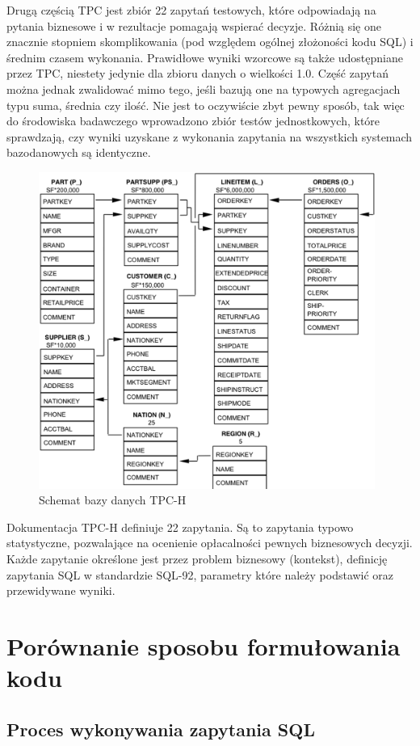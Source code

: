 \documentclass[12pt]{extarticle}
\begin{document}
    Drugą częścią TPC jest zbiór 22 zapytań testowych, które odpowiadają na pytania biznesowe i w rezultacje pomagają wspierać decyzje. Różnią się one znacznie stopniem skomplikowania (pod względem ogólnej złożoności kodu SQL) i średnim czasem wykonania. Prawidłowe wyniki wzorcowe są także udostępniane przez TPC, niestety jedynie dla zbioru danych o wielkości 1.0. Część zapytań można jednak zwalidować mimo tego, jeśli bazują one na typowych agregacjach typu suma, średnia czy ilość. Nie jest to oczywiście zbyt pewny sposób, tak więc do środowiska badawczego wprowadzono zbiór testów jednostkowych, które sprawdzają, czy wyniki uzyskane z wykonania zapytania na wszystkich systemach bazodanowych są identyczne.


\begin{figure}[h]
\centering
\includegraphics[width=11cm]{tpc-schema.png}
\caption{Schemat bazy danych TPC-H}
\label{fig:tpcschema}
\end{figure}

    Dokumentacja TPC-H definiuje 22 zapytania. Są to zapytania typowo statystyczne, pozwalające na ocenienie opłacalności pewnych biznesowych decyzji. Każde zapytanie określone jest przez problem biznesowy (kontekst), definicję zapytania SQL w standardzie SQL-92, parametry które należy podstawić oraz przewidywane wyniki.


\section{Porównanie sposobu formułowania kodu}

\subsection{Proces wykonywania zapytania SQL}
\end{document}
